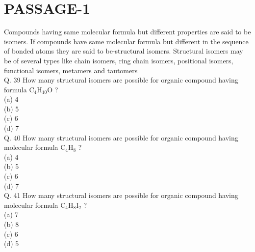 \documentclass[10pt]{article}
\begin{document}
\section*{PASSAGE-1}
Compounds having same molecular formula but different properties are said to be isomers. If compounds have same molecular formula but different in the sequence of bonded atoms they are said to be-structural isomers. Structural isomers may be of several types like chain isomers, ring chain isomers, positional isomers, functional isomers, metamers and tautomers\\
Q. 39 How many structural isomers are possible for organic compound having formula $\mathrm{C}_{4} \mathrm{H}_{10} \mathrm{O}$ ?\\
(a) 4\\
(b) 5\\
(c) 6\\
(d) 7\\
Q. 40 How many structural isomers are possible for organic compound having molecular formula $\mathrm{C}_{4} \mathrm{H}_{8}$ ?\\
(a) 4\\
(b) 5\\
(c) 6\\
(d) 7\\
Q. 41 How many structural isomers are possible for organic compound having molecular formula $\mathrm{C}_{4} \mathrm{H}_{8} \mathrm{I}_{2}$ ?\\
(a) 7\\
(b) 8\\
(c) 6\\
(d) 5
\end{document}
